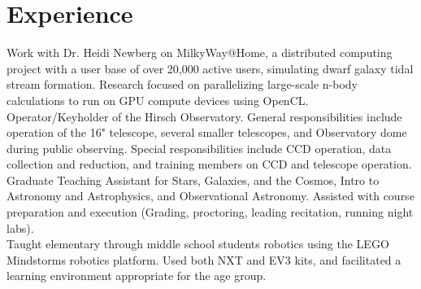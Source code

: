 \documentclass[letterpaper]{deedy-resume} %
\begin{document}
\begin{minipage}[t]{0.66\textwidth} %

\section{Experience}

Work with Dr. Heidi Newberg on MilkyWay@Home, a distributed computing
project with a user base of over 20,000 active users, simulating dwarf galaxy tidal
stream formation. Research focused on parallelizing large-scale n-body calculations
to run on GPU compute devices using OpenCL.
\vspace{3pt}\\
Operator/Keyholder of the Hirsch Observatory. General responsibilities include operation of the 16" telescope, several smaller telescopes, and Observatory dome during public observing. Special responsibilities include CCD operation, data collection and reduction, and training members on CCD and telescope operation.
\vspace{3pt}\\
Graduate Teaching Assistant for Stars, Galaxies, and the Cosmos, Intro to Astronomy and Astrophysics, and Observational Astronomy. Assisted with course
preparation and execution (Grading, proctoring, leading recitation, running night labs).
\vspace{3pt}\\
\vspace{3pt}
Taught elementary through middle school students robotics using the LEGO
Mindstorms robotics platform. Used both NXT and EV3 kits, and facilitated a learning
environment appropriate for the age group.
\vspace{3pt}\\
\vspace{3pt}





\end{minipage}
\end{document}
